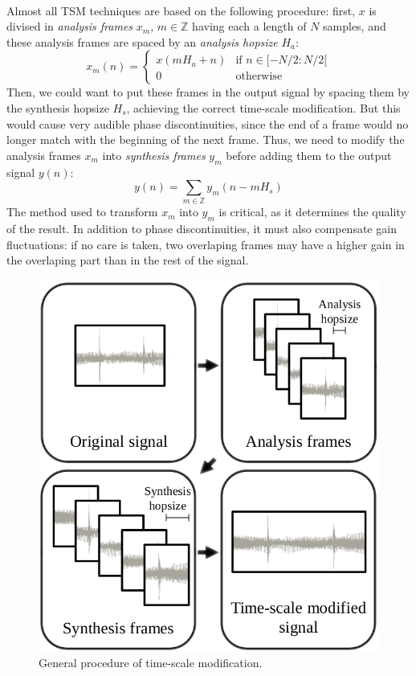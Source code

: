 \documentclass[letterpaper]{article}
\begin{document}
\paragraph{}
Almost all TSM techniques are based on the following procedure: first, \(x\)
is divised in \emph{analysis frames} \(x_m,\,m\in\mathbb{Z}\) having each a
length of \(N\) samples, and these analysis frames are spaced by an
\emph{analysis hopsize} \(H_a\):
\[x_m(n)=\begin{cases}
	x(mH_a + n) & \text{if }n\in [-N/2:N/2[ \\
	0           & \text{otherwise}
\end{cases}\]
Then, we could want to put these frames in the output signal by spacing them by
the synthesis hopsize \(H_s\), achieving the correct time-scale modification. But this
would cause very audible phase discontinuities, since the end of a frame would
no longer match with the beginning of the next frame. Thus, we need to modify
the analysis frames \(x_m\) into \emph{synthesis frames} \(y_m\) before adding
them to the output signal \(y(n)\):
\[y(n) = \sum_{m\in\mathbb{Z}}y_m(n-mH_s)\]
The method used to transform \(x_m\) into \(y_m\) is critical, as it determines
the quality of the result. In addition to phase discontinuities, it must also
compensate gain fluctuations: if no care is taken, two overlaping frames may have
a higher gain in the overlaping part than in the rest of the signal.
\begin{figure}[h]
\includegraphics[width=\linewidth]{pipeline.png}
\caption{General procedure of time-scale modification.}
\end{figure}
\end{document}
